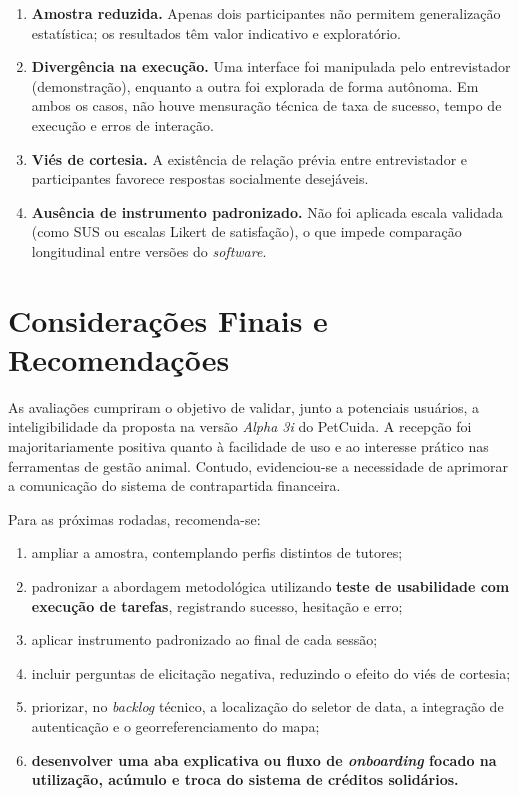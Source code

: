 \documentclass[12pt,a4paper]{article}
\begin{document}
\begin{enumerate}[leftmargin=*]
  \item \textbf{Amostra reduzida.} Apenas dois participantes não permitem generalização estatística; os resultados têm valor indicativo e exploratório.
  \item \textbf{Divergência na execução.} Uma interface foi manipulada pelo entrevistador (demonstração), enquanto a outra foi explorada de forma autônoma. Em ambos os casos, não houve mensuração técnica de taxa de sucesso, tempo de execução e erros de interação.
  \item \textbf{Viés de cortesia.} A existência de relação prévia entre entrevistador e participantes favorece respostas socialmente desejáveis.
  \item \textbf{Ausência de instrumento padronizado.} Não foi aplicada escala validada (como SUS ou escalas Likert de satisfação), o que impede comparação longitudinal entre versões do \textit{software}.
\end{enumerate}

\section{Considerações Finais e Recomendações}

As avaliações cumpriram o objetivo de validar, junto a potenciais usuários, a inteligibilidade da proposta na versão \textit{Alpha 3i} do PetCuida. A recepção foi majoritariamente positiva quanto à facilidade de uso e ao interesse prático nas ferramentas de gestão animal. Contudo, evidenciou-se a necessidade de aprimorar a comunicação do sistema de contrapartida financeira.

Para as próximas rodadas, recomenda-se:

\begin{enumerate}[label=\textbf{R\arabic*.},leftmargin=1.6cm]
  \item ampliar a amostra, contemplando perfis distintos de tutores;
  \item padronizar a abordagem metodológica utilizando \textbf{teste de usabilidade com execução de tarefas}, registrando sucesso, hesitação e erro;
  \item aplicar instrumento padronizado ao final de cada sessão;
  \item incluir perguntas de elicitação negativa, reduzindo o efeito do viés de cortesia;
  \item priorizar, no \textit{backlog} técnico, a localização do seletor de data, a integração de autenticação e o georreferenciamento do mapa;
  \item \textbf{desenvolver uma aba explicativa ou fluxo de \textit{onboarding} focado na utilização, acúmulo e troca do sistema de créditos solidários.}
\end{enumerate}
\end{document}
